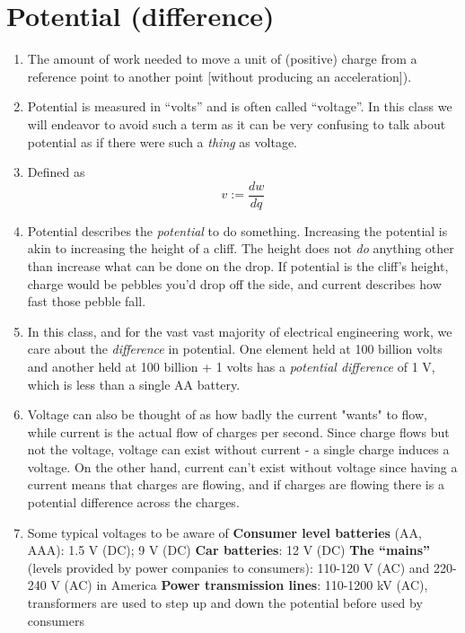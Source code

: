 \documentclass[11pt]{book}
\begin{document}
\section{Potential (difference)}
\begin{enumerate}
	\item The amount of work needed to move a unit of (positive) charge from a reference point to another point [without producing an acceleration]).
	\item Potential is measured in ``volts'' and is often called ``voltage''. In this class we will endeavor to avoid such a term as it can be very confusing to talk about potential as if there were such a \textit{thing} as voltage.
	\item Defined as 
	\begin{equation}
		v:= \frac{dw}{dq}
	\end{equation}
	\item Potential describes the \textit{potential} to do something. Increasing the potential is akin to increasing the height of a cliff. The height does not \textit{do} anything other than increase what can be done on the drop. If potential is the cliff's height, charge would be pebbles you'd drop off the side, and current describes how fast those pebble fall.
	\item In this class, and for the vast vast majority of electrical engineering work, we care about the \textit{difference} in potential. One element held at 100 billion volts and another held at 100 billion + 1 volts has a \textit{potential difference} of 1 V, which is less than a single AA battery.
	\item Voltage can also be thought of as how badly the current "wants" to flow, while current is the actual flow of charges per second. Since charge flows but not the voltage, voltage can exist without current - a single charge induces a voltage. On the other hand, current can't exist without voltage since having a current means that charges are flowing, and if charges are flowing there is a potential difference across the charges. 
	\item Some typical voltages to be aware of
	\subitem \textbf{Consumer level batteries} (AA, AAA): 1.5 V (DC); 9 V (DC) 
	\subitem \textbf{Car batteries}: 12 V (DC)
	\subitem \textbf{The ``mains''} (levels provided by power companies to consumers): 110-120 V (AC) and 220-240 V (AC) in America
	\subitem \textbf{Power transmission lines}: 110-1200 kV (AC), transformers are used to step up and down the potential before used by consumers
\end{enumerate}
\end{document}
